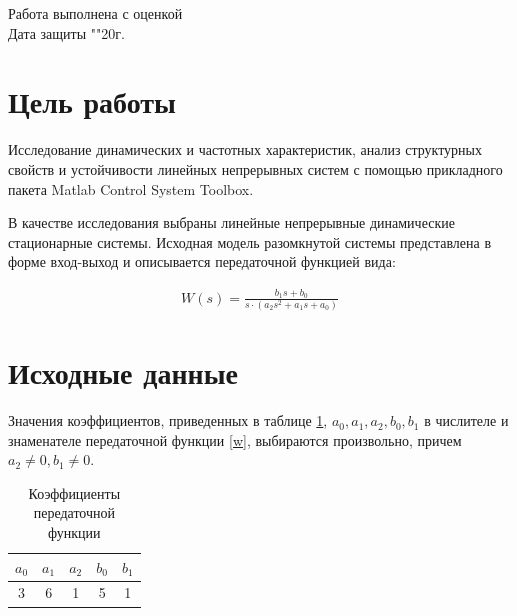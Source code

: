 \documentclass[a4paper, 12pt]{article}
\begin{document}
\begin{titlepage}
		Работа выполнена с оценкой \hspace{0.5cm} \underline{\hspace{10cm}} \\ 
		\vspace{1cm}
		Дата защиты "\underline{\hspace{0.4cm}}"\hspace{0.1cm}\underline{\hspace{1.5cm}}\hspace{0.1cm}20\underline{\hspace{0.4cm}}г.
		
		\end{titlepage}

\section*{Цель работы}
Исследование динамических и частотных характеристик, анализ структурных свойств и устойчивости линейных непрерывных систем с помощью прикладного пакета Matlab Control System Toolbox.\par
В качестве исследования выбраны линейные непрерывные динамические стационарные системы. Исходная модель  разомкнутой системы представлена в форме вход-выход и описывается передаточной функцией вида:\par
\begin{align}
	W(s) = \frac{b_1s + b_0}{s\cdot(a_2s^2 + a_1s + a_0)}
	\label{w}
\end{align}

\section*{Исходные данные}
Значения коэффициентов, приведенных в таблице \ref{tab:dateTab},  $a_0, a_1, a_2, b_0, b_1$ в числителе и знаменателе передаточной функции \ref{w}, выбираются произвольно, причем $a_2 \neq 0, b_1 \neq 0$.

\begin{table}[h!]
	\centering
	\begin{threeparttable}
		\caption{Коэффициенты передаточной функции}
		\begin{tabular}{|c|c|c|c|c|}
			\hline
			$a_0$	&	$a_1$	&	$a_2$	&	$b_0$	&	$b_1$\\
			\hline
			3		&	6		&	1		&	5		&	1\\
			\hline	
		\end{tabular}
		\label{tab:dateTab}
	\end{threeparttable}
\end{table}
\end{document}
